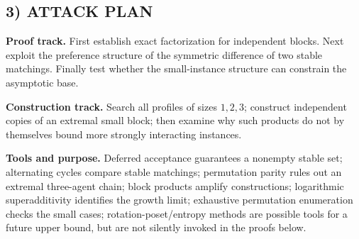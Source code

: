 \documentclass[11pt,a4paper]{article}
\theoremstyle{definition}
\theoremstyle{remark}
\begin{document}
\subsection*{3) ATTACK PLAN}
\textbf{Proof track.} First establish exact factorization for independent blocks.
Next exploit the preference structure of the symmetric difference of two stable
matchings. Finally test whether the small-instance structure can constrain the
asymptotic base.

\textbf{Construction track.} Search all profiles of sizes $1,2,3$; construct independent
copies of an extremal small block; then examine why such products do not by themselves
bound more strongly interacting instances.

\textbf{Tools and purpose.} Deferred acceptance guarantees a nonempty stable set;
alternating cycles compare stable matchings; permutation parity rules out an
extremal three-agent chain; block products amplify constructions; logarithmic
superadditivity identifies the growth limit; exhaustive permutation enumeration
checks the small cases; rotation-poset/entropy methods are possible tools for a
future upper bound, but are not silently invoked in the proofs below.
\end{document}
